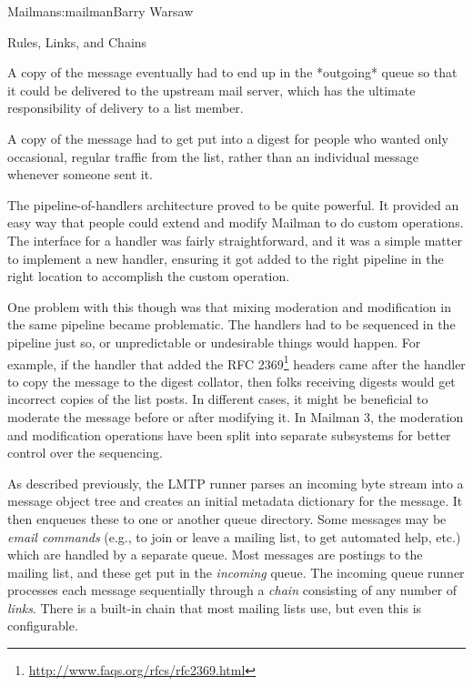 \begin{aosachapter}{Mailman}{s:mailman}{Barry Warsaw}
\begin{aosasect1}{Rules, Links, and Chains}
\begin{aosaitemize}
\item A copy of the message eventually had to end up in the *outgoing*
  queue so that it could be delivered to the upstream mail server,
  which has the ultimate responsibility of delivery to a list member.

\item A copy of the message had to get put into a digest for people
  who wanted only occasional, regular traffic from the list, rather
  than an individual message whenever someone sent it.

\end{aosaitemize}

The pipeline-of-handlers architecture proved to be quite powerful.  It
provided an easy way that people could extend and modify Mailman to do
custom operations.  The interface for a handler was fairly
straightforward, and it was a simple matter to implement a new
handler, ensuring it got added to the right pipeline in the right
location to accomplish the custom operation.

One problem with this though was that mixing moderation and
modification in the same pipeline became problematic.  The handlers
had to be sequenced in the pipeline just so, or unpredictable or
undesirable things would happen.  For example, if the handler that
added the RFC
2369\footnote{\url{http://www.faqs.org/rfcs/rfc2369.html}}
 headers came after the handler to copy the message to
the digest collator, then folks receiving digests would get incorrect
copies of the list posts.  In different cases, it might be beneficial
to moderate the message before or after modifying it.  In Mailman 3,
the moderation and modification operations have been split into
separate subsystems for better control over the sequencing.

As described previously, the LMTP runner parses an incoming byte
stream into a message object tree and creates an initial metadata
dictionary for the message.  It then enqueues these to one or another
queue directory.  Some messages may be \emph{email commands} (e.g., to
join or leave a mailing list, to get automated help, etc.) which are
handled by a separate queue.  Most messages are postings to the
mailing list, and these get put in the \emph{incoming} queue.  The
incoming queue runner processes each message sequentially through a
\emph{chain} consisting of any number of \emph{links}.  There is a
built-in chain that most mailing lists use, but even this is
configurable.


\end{aosasect1}
\end{aosachapter}
